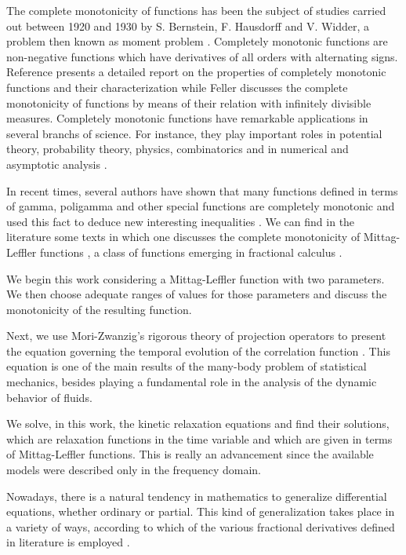 \documentclass[12pt]{amsart}
\numberwithin{equation}{section}
\begin{document}
The complete monotonicity of functions has been the subject of studies carried
out between 1920 and 1930 by S. Bernstein, F. Hausdorff and V. Widder, a
problem then known as moment problem
\cite{Bernstein:1929,Hausdorff:1921,Widder:1931}. Completely monotonic
functions are non-negative functions which have derivatives of all orders with alternating signs. Reference \cite{Widder:1946} presents a detailed report on the properties of completely
monotonic functions and their characterization while Feller \cite{Feller:1970}
discusses the complete monotonicity of functions by means of their relation
with infinitely divisible measures.  Completely monotonic functions have
remarkable applications in several branchs of science. For instance, they play
important roles in potential theory, probability theory, physics, combinatorics
and in numerical and asymptotic analysis \cite{Li:2013,Lokenath:2003,
Machado:2010}. 

In recent times, several authors have shown that many functions defined in
terms of gamma, poligamma and other special functions are completely monotonic
and used this fact to deduce new interesting inequalities
\cite{Alzer:1997,Berg:2001,Ismail:1986,Merkle:2014}. We can find in the literature some texts in which one discusses the complete monotonicity
of Mittag-Leffler functions \cite{Miller:1997,Samko:2001,An:2012,Vaz:2014,Garrapa:2015,Simon:2015}, a class of functions emerging in fractional calculus
\cite{Machado:2011}.

We begin this work considering a Mittag-Leffler function with two parameters.
We then choose adequate  ranges of values for those parameters and discuss
the monotonicity of the resulting function. 

Next, we use Mori-Zwanzig's rigorous theory  of projection operators to present
the equation governing the temporal evolution of the correlation function
\cite{Popov:2014}.  This equation is one of the main results of the many-body
problem of statistical mechanics, besides playing a fundamental role in the
analysis of the dynamic behavior of fluids. 

We solve, in this work, the kinetic relaxation equations and find
their solutions, which are relaxation functions in the time variable and which are given
in terms of Mittag-Leffler functions. This is really an advancement since the available
models were described only in the frequency domain. 

Nowadays, there is a natural tendency in mathematics to generalize differential equations,
whether ordinary or partial. This kind of generalization takes place in a variety of ways,
according to which of the various fractional derivatives defined in literature is employed
\cite{Podlubny:1999,Hilfer:2000,Capelas:2015,Machado:2014}. 
\end{document}
